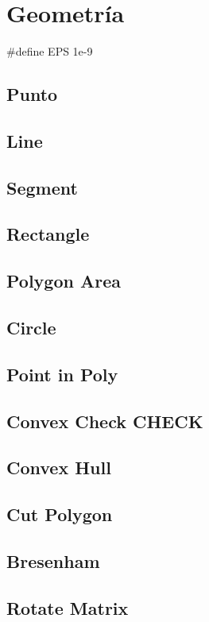 \documentclass[10pt,landscape,twocolumn,a4paper,notitlepage]{article}
\newcommand\cppfile[2][]{

}
\begin{document}
\section{Geometría}
\#define EPS 1e-9
\subsection{Punto}
\cppfile{geometria/pto}
\subsection{Line}
\cppfile{geometria/line}
\subsection{Segment}
\cppfile{geometria/segm}
\subsection{Rectangle}
\cppfile{geometria/rect}
\subsection{Polygon Area}
\cppfile{geometria/area}
\subsection{Circle}
\cppfile{geometria/circle}
\subsection{Point in Poly}
\cppfile{geometria/point.in.poly}
\subsection{Convex Check CHECK}
\cppfile{geometria/convex.check}
\subsection{Convex Hull}
\cppfile{geometria/convex.hull}
\subsection{Cut Polygon}
\cppfile{geometria/cut.polygon}
\subsection{Bresenham}
\cppfile{geometria/bresenham}
\subsection{Rotate Matrix}
\cppfile{geometria/rotate}
\end{document}
